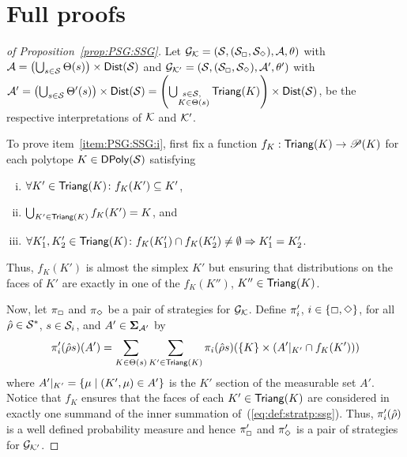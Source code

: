 
\appendix




\section{Full proofs}


\begin{proof}[of Proposition~\ref{prop:PSG:SSG}]
  Let ${\mathcal{G}_{\mathcal{K}}}=(\mathcal{S},(\mathcal{S}_{\Box},\mathcal{S}_{\Diamond}),\mathcal{A},\theta)$ with
  $\mathcal{A}=\left(\bigcup_{s\in\mathcal{S}}\Theta(s)\right)\times\mathsf{Dist}(\mathcal{S})$
  and
  ${\mathcal{G}_{\mathcal{K}'}}=(\mathcal{S},(\mathcal{S}_{\Box},\mathcal{S}_{\Diamond}),\mathcal{A}',\theta')$ with
  $\mathcal{A}'=\left(\bigcup_{s\in\mathcal{S}}\Theta'(s)\right)\times\mathsf{Dist}(\mathcal{S})=\left(\bigcup_{\substack{s\in\mathcal{S},~\\K\in\Theta(s)}}\mathsf{Triang}(K)\right)\times\mathsf{Dist}(\mathcal{S})$,
  be the respective interpretations of $\mathcal{K}$ and $\mathcal{K}'$.

  To prove item~\ref{item:PSG:SSG:i}, first fix a function
  $f_K:\mathsf{Triang}(K)\to\mathscr{P}(K)$ for each polytope
  $K\in\mathsf{DPoly}(\mathcal{S})$ satisfying
  \begin{enumerate}[(i)]
  \item%
    $\forall {K'\in\mathsf{Triang}(K)}\colon{f_K(K')\subseteq K'}$,
  \item%
    $\bigcup_{K'\in\mathsf{Triang}(K)}f_K(K') = K$, and
  \item%
    $\forall {K'_1,K'_2\in\mathsf{Triang}(K)}\colon {{f_K(K'_1)\cap f_K(K'_2)\neq\emptyset} \Rightarrow{K'_1=K'_2}}$.
  \end{enumerate}
  Thus, $f_K(K')$ is almost the simplex $K'$ but ensuring that
  distributions on the faces of $K'$ are exactly in one of the
  $f_K(K'')$, $K''\in\mathsf{Triang}(K)$.


  Now, let $\pi_{{\Box}}$ and $\pi_{{\Diamond}}$ be a pair of
  strategies for ${\mathcal{G}_{\mathcal{K}}}$.  Define $\pi'_{i}$,
  $i\in\{{\Box},{\Diamond}\}$, for all $\hat{\rho}\in\mathcal{S}^*$,
  $s\in\mathcal{S}_{i}$, and $A'\in\bm{\Sigma}_{\mathcal{A}'}$ by
%
  \begin{equation}\label{eq:def:stratp:ssg}
    \pi'_{i}(\hat{\rho}s)(A') = \sum_{K\in\Theta(s)} \sum_{K'\in\mathsf{Triang}(K)} \pi_{i}(\hat{\rho}s)(\{K\}\times({A'{|_{K'}}}\cap f_K(K')))
  \end{equation}
%
  where ${A'{|_{K'}}}=\{\mu\mid (K',\mu)\in A'\}$ is the $K'$ section
  of the measurable set $A'$.
%
  Notice that $f_K$ ensures that the faces of each $K'\in\mathsf{Triang}(K)$
  are considered in exactly one summand of the inner summation
  of~(\ref{eq:def:stratp:ssg}).  Thus, $\pi'_{i}(\hat{\rho})$ is a
  well defined probability measure and hence $\pi'_{{\Box}}$ and
  $\pi'_{{\Diamond}}$ is a pair of strategies for ${\mathcal{G}_{\mathcal{K}'}}$.


\end{proof}

